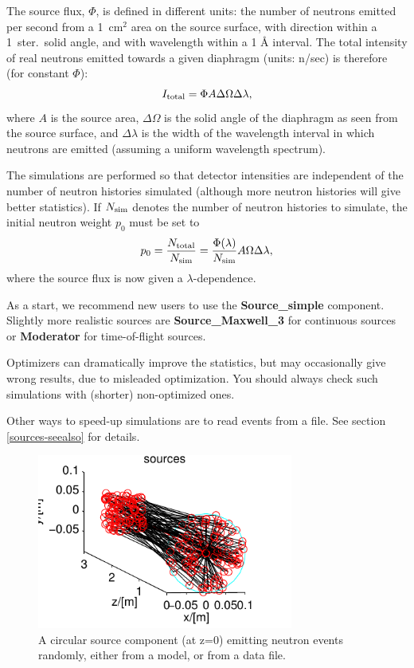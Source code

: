 The source flux, $\Phi$, is defined in different units:
the number of neutrons emitted per second from a
1~cm$^2$ area on the source surface,
with direction within a 1~ster.\ solid angle,
and with wavelength within a 1 {\AA} interval.
The total intensity of real neutrons emitted towards a given diaphragm
(units: n/sec) is therefore (for constant $\Phi$):
\begin{equation}
I_{\rm total} = \Phi A \Delta\Omega \Delta\lambda ,
\end{equation}
where $A$ is the source area, $\Delta\Omega$ is the solid angle of the
diaphragm as seen from the source surface, and $\Delta\lambda$ is the
width of the wavelength interval in which neutrons are emitted (assuming
a uniform wavelength spectrum).

The simulations are performed so that detector intensities
are independent of the number of neutron histories simulated
(although more neutron histories will give better statistics).
If $N_{\rm sim}$ denotes the number of
neutron histories to simulate, the initial neutron weight $p_0$ must be set to
\begin{equation}
\label{proprule}
p_0 = \frac{N_{\rm total}}{N_{\rm sim}} =
    \frac{\Phi(\lambda)}{N_{\rm sim}} A \Omega \Delta\lambda ,
\end{equation}
where the source flux is now given a $\lambda$-dependence.

As a start, we recommend new \MCS users to use the
{\bf Source\_simple} component.
Slightly more realistic sources are {\bf Source\_Maxwell\_3} for
continuous sources or {\bf Moderator} for time-of-flight sources.

Optimizers can dramatically improve the statistics, but may occasionally
give wrong results, due to misleaded optimization.
You should always check such simulations with (shorter) non-optimized ones.

Other ways to speed-up simulations are to read events from a file.
See section \ref{sources-seealso} for details.

\begin{figure}
  \begin{center}
    \includegraphics[width=0.75\textwidth]{figures/sources}
  \end{center}
\caption{A circular source component (at z=0) emitting neutron events randomly, either from a model, or from a data file.}
\label{f:source}
\end{figure}

